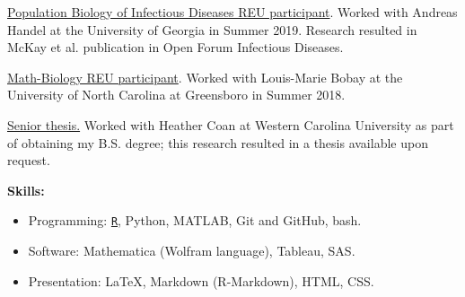 \documentclass[11pt]{article}
\begin{document}
\item \ul{Population Biology of Infectious Diseases REU participant}. Worked with Andreas Handel at the University of Georgia in Summer 2019. Research resulted in McKay et al. publication in Open Forum Infectious Diseases.
\item \underline{Math-Biology REU participant}. Worked with Louis-Marie Bobay at the University of North Carolina at Greensboro in Summer 2018.
\item \ul{Senior thesis.} Worked with Heather Coan at Western Carolina University as part of obtaining my B.S. degree; this research resulted in a thesis available upon request.

\vspace{0.2in}
\textbf{Skills:}

\begin{itemize}[noitemsep]
\item Programming: \ul{\texttt{R}}, Python, MATLAB, Git and GitHub, bash.
\item Software: Mathematica (Wolfram language), Tableau, SAS.
\item Presentation: \LaTeX{}, Markdown (R-Markdown), HTML, CSS.
\end{itemize}
\end{document}
